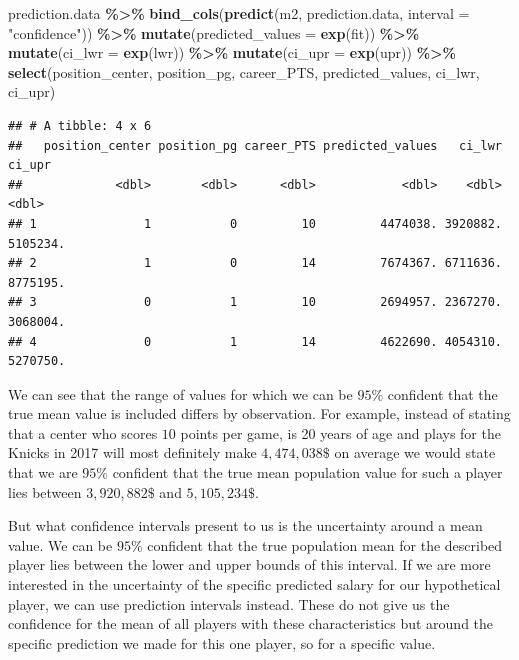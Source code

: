 \documentclass[
]{book}
\newenvironment{Shaded}{\begin{snugshade}}{\end{snugshade}}
\newcommand{\AttributeTok}[1]{\textcolor[rgb]{0.13,0.29,0.53}{#1}}
\newcommand{\FunctionTok}[1]{\textcolor[rgb]{0.13,0.29,0.53}{\textbf{#1}}}
\newcommand{\NormalTok}[1]{#1}
\newcommand{\SpecialCharTok}[1]{\textcolor[rgb]{0.81,0.36,0.00}{\textbf{#1}}}
\newcommand{\StringTok}[1]{\textcolor[rgb]{0.31,0.60,0.02}{#1}}
\begin{document}
\begin{Shaded}
\begin{Highlighting}[]
\NormalTok{prediction.data }\SpecialCharTok{\%\textgreater{}\%} 
  \FunctionTok{bind\_cols}\NormalTok{(}\FunctionTok{predict}\NormalTok{(m2, prediction.data, }\AttributeTok{interval =} \StringTok{"confidence"}\NormalTok{)) }\SpecialCharTok{\%\textgreater{}\%} 
  \FunctionTok{mutate}\NormalTok{(}\AttributeTok{predicted\_values =} \FunctionTok{exp}\NormalTok{(fit)) }\SpecialCharTok{\%\textgreater{}\%}
  \FunctionTok{mutate}\NormalTok{(}\AttributeTok{ci\_lwr =} \FunctionTok{exp}\NormalTok{(lwr)) }\SpecialCharTok{\%\textgreater{}\%}
  \FunctionTok{mutate}\NormalTok{(}\AttributeTok{ci\_upr =} \FunctionTok{exp}\NormalTok{(upr)) }\SpecialCharTok{\%\textgreater{}\%}
  \FunctionTok{select}\NormalTok{(position\_center, position\_pg, career\_PTS, predicted\_values, ci\_lwr, ci\_upr)}
\end{Highlighting}
\end{Shaded}

\begin{verbatim}
## # A tibble: 4 x 6
##   position_center position_pg career_PTS predicted_values   ci_lwr   ci_upr
##             <dbl>       <dbl>      <dbl>            <dbl>    <dbl>    <dbl>
## 1               1           0         10         4474038. 3920882. 5105234.
## 2               1           0         14         7674367. 6711636. 8775195.
## 3               0           1         10         2694957. 2367270. 3068004.
## 4               0           1         14         4622690. 4054310. 5270750.
\end{verbatim}

We can see that the range of values for which we can be \(95\%\) confident that
the true mean value is included differs by observation. For example, instead of
stating that a center who scores \(10\) points per game, is 20 years
of age and plays for the Knicks in 2017 will most definitely make \(4,474,038\$\)
on average we would state that we are \(95\%\) confident that the true mean
population value for such a player lies between \(3,920,882\$\) and \(5,105,234\$\).

But what confidence intervals present to us is the uncertainty around a mean
value. We can be \(95\%\) confident that the true population mean for the
described player lies between the lower and upper bounds of this interval.
If we are more interested in the uncertainty of the specific predicted salary
for our hypothetical player, we can use prediction intervals instead. These do
not give us the confidence for the mean of all players with these
characteristics but around the specific prediction we made for this one player,
so for a specific value.
\end{document}
